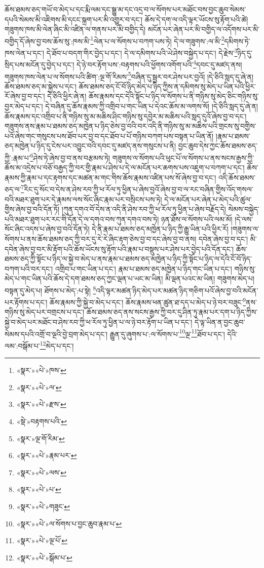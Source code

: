 ཆོས་ཐམས་ཅད་གཡོ་བ་མེད་པ་དང་རྨི་ལམ་དང་སྒྱུ་མ་དང་འདྲ་བ་ལ་སོགས་པར་མཐོང་བས་བྱང་ཆུབ་སེམས་དཔའི་སེམས་མི་འཇིགས་མི་དངང་སྐྲག་པར་མི་འགྱུར་བ་དང་། ཆོས་དེ་དག་ལ་འདི་ལྟར་ཡོངས་སུ་རྟོག་པའི་ཚེ། གཟུགས་ཁས་མི་ལེན་ཞིང་མི་འཛིན་ལ་གནས་པར་མི་བགྱིད་དེ། མངོན་པར་ཞེན་པར་མི་བགྱིད་ལ་འདོགས་པར་མི་བགྱིད་དོ་ཞེས་བྱ་བས་ཆོས་སུ་:ཁས་མི་\footnote{«སྣར་»«པེ་»ཁས་}ལེན་པ་ལ་སོགས་པ་བཀག་པས་ཏེ། དེ་ལ་གཟུགས་:ལ་མི་\footnote{«སྣར་»«པེ་»ལ་}དམིགས་ཏེ་ཁས་ལེན་པ་དང་། དེ་ཐོབ་པ་བདག་གིར་བྱེད་པ་དང་། དེ་ལ་དམིགས་པའི་ཡེ་ཤེས་བསྐྱེད་པ་དང་། དེ་རྗེས་\footnote{«སྣར་»«པེ་»རྫས་}ཉིད་དུ་སྲིད་པས་མངོན་དུ་བྱེད་པ་དང་། དེ་ཉེ་བར་རྟོག་པས་:བརྟགས་པའི་ཕྱོགས་འགོག་པའི་\footnote{«སྡེ་»བརྟགས་པའི་}དབང་དུ་མཛད་ནས། གཟུགས་ཁས་ལེན་པ་ལ་སོགས་པའི་ཚིག་:ལྔ་གོ་རིམས་\footnote{«སྣར་»ལྔ་གོ་རིམ་}བཞིན་དུ་སྦྱར་བར་ཤེས་པར་བྱའོ། །དེ་ཅིའི་སླད་དུ་ཞེ་ན། ཆོས་ཐམས་ཅད་མ་སྐྱེས་པ་དང་། ཆོས་ཐམས་ཅད་ངོ་བོ་ཉིད་མེད་པ་ཉིད་ཀྱིས་ན་དམིགས་སུ་མེད་པ་ཡིན་པའི་ཕྱིར་རོ་ཞེས་བྱ་བ་དང་། དེ་ཅིའི་ཕྱིར་ཞེ་ན། ཆོས་རྣམས་དང་དེའི་སྟོང་པ་ཉིད་ལ་སོགས་པ་ནི་གཉིས་སུ་མེད་ཅིང་གཉིས་སུ་བྱར་མེད་པ་དང་། དེ་བཞིན་དུ་ཆོས་རྣམས་ཀྱི་འགྲིབ་པ་གང་ཡིན་པ་དེའང་ཆོས་མ་ལགས་སོ། །དེ་ཅིའི་སླད་དུ་ཞེ་ན། ཆོས་རྣམས་དང་འགྲིབ་པ་ནི་གཉིས་སུ་མ་མཆིས་ཤིང་གཉིས་སུ་དབྱེར་མ་མཆིས་པའི་སླད་དུའོ་ཞེས་བྱ་བ་དང་། གཟུགས་ནས་རྣམ་པ་ཐམས་ཅད་མཁྱེན་པ་ཉིད་ཅེས་བྱ་བའི་བར་འདི་ནི་གཉིས་སུ་མ་མཆིས་པའི་གྲངས་སུ་བགྱིས་པའོ་ཞེས་གང་གསུངས་པས་ཐོབ་པར་བྱ་བ་དང་ཐོབ་པ་པོ་གཉིས་བཀག་པས་བསྟན་པ་ཡིན་ནོ། །རྣམ་པ་ཐམས་ཅད་མཁྱེན་པ་ཉིད་དུ་ངེས་པར་འབྱུང་བའི་དབང་དུ་མཛད་ནས་གསུངས་པ་ནི། བྱང་ཆུབ་དེས་ཀྱང་ཆོས་ཐམས་ཅད་ཀྱི་:རྣམ་པ་\footnote{«སྣར་»«པེ་»རྣམ་པར་}ཤེས་ཏེ་ཞེས་བྱ་བ་ནས་བརྩམས་ཏེ། གཟུགས་ལ་སོགས་པའི་ཕུང་པོ་ལ་སོགས་པ་ནས་སངས་རྒྱས་ཀྱི་ཆོས་མ་འདྲེས་པ་བཅོ་བརྒྱད་ཀྱི་བར་གྱི་རྣམ་པ་ཤེས་པ་དེ་ལ་མངོན་པར་ཆགས་པས་འཇུག་པ་བཀག་པ་དང་། ཆོས་རྣམས་ཀྱི་རྣམ་པ་དང་རྟགས་དང་མཚན་མ་གང་གིས་ཆོས་རྣམས་འཛིན་པས་སོ་ཞེས་བྱ་བ་དང་། འདི་ཆོས་ཐམས་ཅད་ལ་\footnote{«སྣར་»«པེ་»ལས་}རིང་དུ་སོང་བ་དེས་ན་ཤེས་རབ་ཀྱི་ཕ་རོལ་ཏུ་ཕྱིན་པ་ཞེས་བྱའོ་ཞེས་བྱ་བ་ལ་རང་བཞིན་གྱིས་འོད་གསལ་བའི་མཐར་ཐུག་པར་དེ་རྣམས་ལས་སོང་ཞིང་རྣམ་པར་བསྲིངས་པས་ཏེ། དེ་ལ་མངོན་པར་ཞེན་པ་མེད་པའི་ཚུལ་གྱིས་ཞེས་བྱ་བའི་དོན་ཏོ། །ཀུན་དགའ་བོ་དེས་ན་འདི་ནི་ཤེས་རབ་ཀྱི་ཕ་རོལ་ཏུ་ཕྱིན་པ་ཞེས་བརྗོད་དེ། སེམས་བསྐྱེད་པའི་མཐར་ཐུག་པར་རང་གི་དོན་དེ་ལ་དགའ་བས་ཀུན་དགའ་བས་ཏེ། ཉན་ཐོས་ལ་སོགས་པའི་ལམ་མོ། །དེ་ལས་སོང་ཞིང་འདས་པ་ཞེས་བྱ་བའི་དོན་ཏེ། དེ་ནི་རྣམ་པ་ཐམས་ཅད་མཁྱེན་པ་ཉིད་ཀྱི་རྒྱུ་ཡིན་པའི་ཕྱིར་རོ། །གཟུགས་ལ་སོགས་པ་ནས་ཆོས་ཐམས་ཅད་ཀྱི་བར་དུ་རེ་རེ་ཞིང་རྟག་ཅེས་བྱ་བ་དང་ཞེས་བྱ་བ་ནས། དབེན་ཞེས་བྱ་བ་དང་། མི་དབེན་ཞེས་བྱ་བར་མི་རྟོག་པའི་ཆོས་ཡོངས་སུ་རྟོག་པའི་རྣམ་པ་བསྡུས་པར་ཤེས་པར་བྱེད་པའི་དོན་དང་། ཆོས་ཐམས་ཅད་ཀྱི་སྟོང་པ་ཉིད་ལ་སྐྱེ་བ་མེད་པ་ནས་རྣམ་པ་ཐམས་ཅད་མཁྱེན་པ་ཉིད་ཀྱི་སྟོང་པ་ཉིད་ལ་དེའི་ངོ་བོ་ཉིད་བཀག་པའི་བར་དང་། འགྲིབ་པ་གང་ཡིན་པ་དང་། རྣམ་པ་ཐམས་ཅད་མཁྱེན་པ་ཉིད་གང་ཡིན་པ་དང་། གཉིས་སུ་མེད་པ་གང་ཡིན་པའི་ཆོས་དེ་དག་ཐམས་ཅད་ཀྱང་ལྡན་པ་ཡང་མ་ཡིན། མི་ལྡན་པའང་མ་ཡིན། གཟུགས་མེད་པ། བསྟན་དུ་མེད་པ། ཐོགས་པ་མེད་:པ་སྟེ། \footnote{«སྣར་»«པེ་»པ་}འདི་ལྟར་མཚན་ཉིད་མེད་པར་མཚན་ཉིད་གཅིག་པའོ་ཞེས་བྱ་བའི་མངོན་པར་རྟོགས་པ་དང་། ཆོས་རྣམས་ཀྱི་སྐྱེ་བ་མེད་པ་དང་། ཆོས་རྣམས་ཕན་ཚུན་ཐ་དད་པ་མེད་པ་ཉེ་བར་བཟུང་\footnote{«སྣར་»«པེ་»གཟུང་}ནས་གཉིས་སུ་མེད་པར་བགྲངས་པ་དང་། ཆོས་ཐམས་ཅད་ནས་སངས་རྒྱས་ཀྱི་བར་དུ་ཤིན་ཏུ་རྣམ་པར་དག་པ་ཉིད་ཀྱིས་སྐྱེ་བ་མེད་པར་མཐོང་བ་ཤེས་རབ་ཀྱི་ཕ་རོལ་ཏུ་ཕྱིན་པ་ལ་ཉེ་བར་རྟོག་པ་ཡིན་པ་དང་། དེ་ལྟ་ཡིན་ན་བྱང་ཆུབ་སེམས་དཔའི་འགྲོ་བ་ལྔའི་བྱེ་བྲག་མེད་པ་དང་། རྒྱུན་དུ་ཞུགས་པ་:ལ་སོགས་པ་\footnote{«སྣར་»«པེ་»ལ་སོགས་པ་བྱང་ཆུབ་རྣམ་པ་}ལྔ་\footnote{«སྣར་»«པེ་»ལྔ་པོ་}ཐོབ་པ་དང་། དེའི་ལམ་:བསྒོམ་པ་\footnote{«སྣར་»«པེ་»སྒོམ་པ་}མེད་པ་དང་། 
